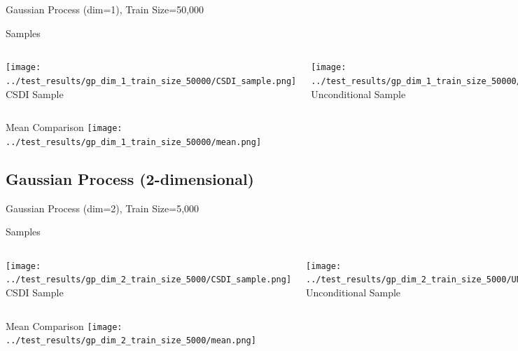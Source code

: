 \documentclass[8pt]{beamer}
\renewcommand{\|}{\ensuremath{\hspace{0.1cm} | \hspace{0.1cm}}}
\begin{document}
    \begin{frame}{Gaussian Process (dim=1), Train Size=50,000}
    \begin{block}{Samples}
    \begin{columns}
        \centering
        \texttt{[image: ../test\_results/gp\_dim\_1\_train\_size\_50000/CSDI\_sample.png]}
        CSDI Sample
        
        \centering
        \texttt{[image: ../test\_results/gp\_dim\_1\_train\_size\_50000/UNCOND\_sample.png]}
        Unconditional Sample
    \end{columns}
    \end{block}

    \begin{block}{Mean Comparison}
    \centering
    \texttt{[image: ../test\_results/gp\_dim\_1\_train\_size\_50000/mean.png]}
    \end{block}
    \end{frame}

    \subsection{Gaussian Process (2-dimensional)}

    \begin{frame}{Gaussian Process (dim=2), Train Size=5,000}
    \begin{block}{Samples}
    \begin{columns}
        \centering
        \texttt{[image: ../test\_results/gp\_dim\_2\_train\_size\_5000/CSDI\_sample.png]}
        CSDI Sample
        
        \centering
        \texttt{[image: ../test\_results/gp\_dim\_2\_train\_size\_5000/UNCOND\_sample.png]}
        Unconditional Sample
    \end{columns}
    \end{block}

    \begin{block}{Mean Comparison}
    \centering
    \texttt{[image: ../test\_results/gp\_dim\_2\_train\_size\_5000/mean.png]}
    \end{block}
    \end{frame}
\end{document}
